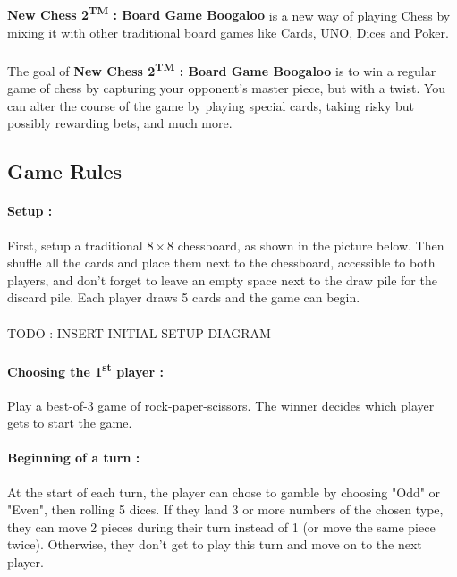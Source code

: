 \documentclass[12pt]{article}
\begin{document}
            \paragraph{}
                \textbf{New Chess 2\textsuperscript{TM} : Board Game Boogaloo} is a new way of playing Chess by mixing it with other traditional board games like Cards, UNO, Dices and Poker.
            \paragraph{}
                The goal of \textbf{New Chess 2\textsuperscript{TM} : Board Game Boogaloo} is to win a regular game of chess by capturing your opponent's master piece, but with a twist. You can alter the course of the game by playing special cards, taking risky but possibly rewarding bets, and much more.
        \subsection{Game Rules}
            \paragraph{Setup :\\}
                First, setup a traditional $8\times8$ chessboard, as shown in the picture below. Then shuffle all the cards and place them next to the chessboard, accessible to both players, and don't forget to leave an empty space next to the draw pile for the discard pile. Each player draws 5 cards and the game can begin.
            \paragraph{}
                \centerline{TODO : INSERT INITIAL SETUP DIAGRAM}
            \paragraph{Choosing the 1\textsuperscript{st} player :\\}
                Play a best-of-3 game of rock-paper-scissors. The winner decides which player gets to start the game.
            \paragraph{Beginning of a turn :\\}
                At the start of each turn, the player can chose to gamble by choosing "Odd" or "Even", then rolling 5 dices. If they land 3 or more numbers of the chosen type, they can move 2 pieces during their turn instead of 1 (or move the same piece twice). Otherwise, they don't get to play this turn and move on to the next player.
\end{document}
